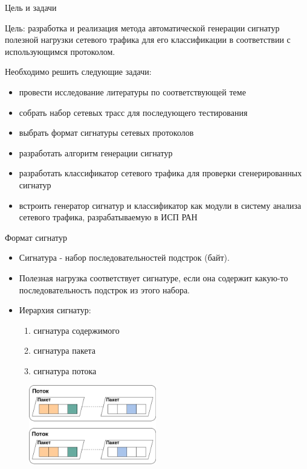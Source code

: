 \documentclass[10pt]{beamer}
\begin{document}
\begin{frame}{Цель и задачи}
    \begin{block}{Цель:}
        разработка и реализация метода автоматической
        генерации сигнатур полезной нагрузки сетевого трафика для его классификации
        в соответствии с использующимся протоколом.
    \end{block}

    \begin{block}{Необходимо решить следующие задачи:}
        \begin{itemize}
            \item провести исследование литературы по соответствующей теме
            \item собрать набор сетевых трасс для последующего тестирования
            \item выбрать формат сигнатуры сетевых протоколов
            \item разработать алгоритм генерации сигнатур
            \item разработать классификатор сетевого трафика для проверки сгенерированных сигнатур
            \item встроить генератор сигнатур и классификатор как модули в систему анализа сетевого трафика, разрабатываемую в ИСП РАН
        \end{itemize}
    \end{block}

\end{frame}

\begin{frame}{Формат сигнатур}
    \begin{itemize}
        \item Сигнатура - набор последовательностей подстрок (байт).
        \item Полезная нагрузка соответствует
        сигнатуре, если она содержит какую-то последовательность подстрок из этого набора.
        \item Иерархия сигнатур:
        \begin{enumerate}
            \item сигнатура содержимого
            \item сигнатура пакета
            \item сигнатура потока
        \end{enumerate}
    \end{itemize}

    \begin{figure}
        \begin{adjustwidth}{-2em}{-2em}
            \centering
            \includegraphics[width=15em]{../images/signature_structure_v2.png}
        \end{adjustwidth}
    \end{figure}

\end{frame}
\end{document}

